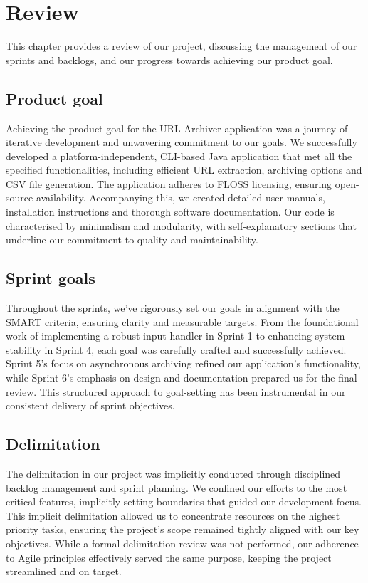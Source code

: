 \section{Review}
This chapter provides a review of our project, discussing the management of our sprints and backlogs, and our progress towards achieving our product goal.

\subsection{Product goal}
Achieving the product goal for the URL Archiver application was a journey of iterative development and unwavering commitment to our goals.
We successfully developed a platform-independent, CLI-based Java application that met all the specified functionalities, including efficient URL extraction, archiving options and CSV file generation.
The application adheres to FLOSS licensing, ensuring open-source availability.
Accompanying this, we created detailed user manuals, installation instructions and thorough software documentation.
Our code is characterised by minimalism and modularity, with self-explanatory sections that underline our commitment to quality and maintainability.

\subsection{Sprint goals}
Throughout the sprints, we've rigorously set our goals in alignment with the SMART criteria, ensuring clarity and measurable targets.
From the foundational work of implementing a robust input handler in Sprint 1 to enhancing system stability in Sprint 4, each goal was carefully crafted and successfully achieved.
Sprint 5's focus on asynchronous archiving refined our application's functionality, while Sprint 6's emphasis on design and documentation prepared us for the final review.
This structured approach to goal-setting has been instrumental in our consistent delivery of sprint objectives.

\subsection{Delimitation}
The delimitation in our project was implicitly conducted through disciplined backlog management and sprint planning.
We confined our efforts to the most critical features, implicitly setting boundaries that guided our development focus.
This implicit delimitation allowed us to concentrate resources on the highest priority tasks, ensuring the project’s scope remained tightly aligned with our key objectives.
While a formal delimitation review was not performed, our adherence to Agile principles effectively served the same purpose, keeping the project streamlined and on target.

